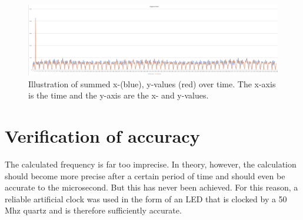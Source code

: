 \documentclass[12pt, a4paper]{report}
\begin{document}
    \noindent
    \begin{figure}[H]
    \centering
    \includegraphics[scale=0.4]{Images/excel_sheet_graph.png}
    
    \caption{Illustration of summed x-(blue), y-values (red) over time. The x-axis is the time and the y-axis are the x- and y-values.}
    \end{figure}
    
    \pagebreak

    \section{Verification of accuracy}
    The calculated frequency is far too imprecise. In theory, however, the calculation should become more precise after a certain period of time and should even be accurate to the microsecond.
    But this has never been achieved. For this reason, a reliable artificial clock was used in the form of an LED that is clocked by a 50 Mhz quartz and is therefore sufficiently accurate.
   
\end{document}
